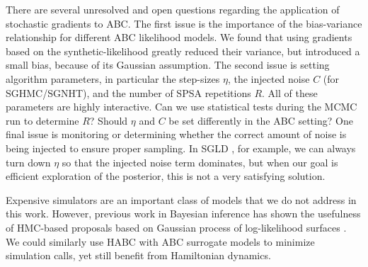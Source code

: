 \documentclass[]{article}
\begin{document}
There are several unresolved and open questions regarding the application of stochastic gradients to ABC.  The first issue is the importance of the bias-variance relationship for different ABC likelihood models.    We found that using gradients based on the synthetic-likelihood greatly reduced their variance, but introduced a small bias, because of its Gaussian assumption.  The second issue is setting algorithm parameters, in particular the step-sizes $\eta$, the injected noise $C$ (for SGHMC/SGNHT), and the number of SPSA repetitions $R$.  All of these parameters are highly interactive.  Can we use statistical tests during the MCMC run to determine $R$?  Should $\eta$ and $C$ be set differently in the ABC setting?  One final issue is monitoring or determining whether the correct amount of noise is being injected to ensure proper sampling.  In SGLD \cite{welling2011bayesian}, for example, we can always turn down $\eta$ so that the injected noise term dominates, but when our goal is efficient exploration of the posterior, this is  not a very satisfying solution.


Expensive simulators are an important class of models that we do not address in this work.  However, previous work in Bayesian inference has shown the usefulness of HMC-based proposals based on Gaussian process of log-likelihood surfaces \cite{rasmussen:2003}.   We could similarly use HABC with  ABC surrogate models \cite{Meeds2014GpsUai,wilkinson:2014} to minimize simulation calls, yet still  benefit from Hamiltonian dynamics.  

\clearpage


\end{document}

